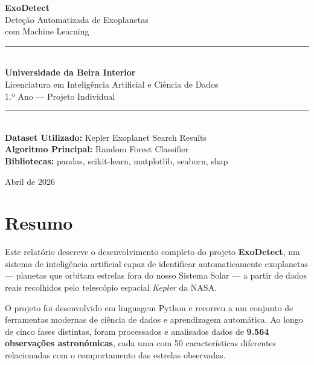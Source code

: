 \documentclass[12pt, a4paper]{report}
\begin{document}

\begin{titlepage}
    \centering
    \vspace*{1cm}

    {\Huge\bfseries\color{azulubi} ExoDetect}\\[0.5cm]
    {\Large\color{cinzatexto} Deteção Automatizada de Exoplanetas\\com Machine Learning}\\[2cm]

    \rule{\textwidth}{1pt}\\[0.5cm]

    {\large
    \textbf{Universidade da Beira Interior}\\
    Licenciatura em Inteligência Artificial e Ciência de Dados\\[0.3cm]
    1.º Ano — Projeto Individual\\[1cm]
    }

    \rule{\textwidth}{1pt}\\[2cm]

    {\large
    \textbf{Dataset Utilizado:} Kepler Exoplanet Search Results\\[0.3cm]
    \textbf{Algoritmo Principal:} Random Forest Classifier\\[0.3cm]
    \textbf{Bibliotecas:} pandas, scikit-learn, matplotlib, seaborn, shap\\[2cm]
    }

    \vfill

    {\large Abril de 2026}

\end{titlepage}

\chapter*{Resumo}

Este relatório descreve o desenvolvimento completo do projeto \textbf{ExoDetect}, um sistema de inteligência artificial capaz de identificar automaticamente exoplanetas — planetas que orbitam estrelas fora do nosso Sistema Solar — a partir de dados reais recolhidos pelo telescópio espacial \textit{Kepler} da NASA.

O projeto foi desenvolvido em linguagem Python e recorreu a um conjunto de ferramentas modernas de ciência de dados e aprendizagem automática. Ao longo de cinco fases distintas, foram processados e analisados dados de \textbf{9.564 observações astronómicas}, cada uma com 50 características diferentes relacionadas com o comportamento das estrelas observadas.
\end{document}
